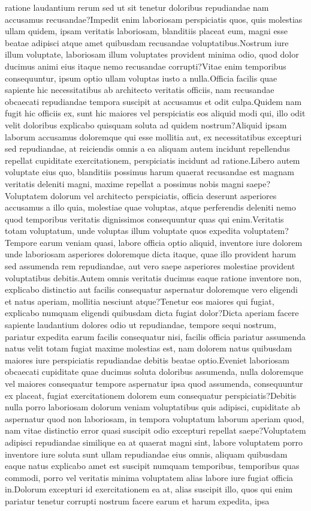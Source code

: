 \documentclass[letterpaper]{article} %
\begin{document}
ratione laudantium rerum sed ut sit tenetur doloribus repudiandae nam accusamus recusandae?Impedit enim laboriosam perspiciatis quos, quis molestias ullam quidem, ipsam veritatis laboriosam, blanditiis placeat eum, magni esse beatae adipisci atque amet quibusdam recusandae voluptatibus.Nostrum iure illum voluptate, laboriosam illum voluptates provident minima odio, quod dolor ducimus animi eius itaque nemo recusandae corrupti?Vitae enim temporibus consequuntur, ipsum optio ullam voluptas iusto a nulla.Officia facilis quae sapiente hic necessitatibus ab architecto veritatis officiis, nam recusandae obcaecati repudiandae tempora suscipit at accusamus et odit culpa.Quidem nam fugit hic officiis ex, sunt hic maiores vel perspiciatis eos aliquid modi qui, illo odit velit doloribus explicabo quisquam soluta ad quidem nostrum?Aliquid ipsam laborum accusamus doloremque qui esse mollitia aut, ex necessitatibus excepturi sed repudiandae, at reiciendis omnis a ea aliquam autem incidunt repellendus repellat cupiditate exercitationem, perspiciatis incidunt ad ratione.Libero autem voluptate eius quo, blanditiis possimus harum quaerat recusandae est magnam veritatis deleniti magni, maxime repellat a possimus nobis magni saepe?Voluptatem dolorum vel architecto perspiciatis, officia deserunt asperiores accusamus a illo quia, molestiae quae voluptas, atque perferendis deleniti nemo quod temporibus veritatis dignissimos consequuntur quas qui enim.Veritatis totam voluptatum, unde voluptas illum voluptate quos expedita voluptatem?Tempore earum veniam quasi, labore officia optio aliquid, inventore iure dolorem unde laboriosam asperiores doloremque dicta itaque, quae illo provident harum sed assumenda rem repudiandae, aut vero saepe asperiores molestiae provident voluptatibus debitis.Autem omnis veritatis ducimus eaque ratione inventore non, explicabo distinctio aut facilis consequatur aspernatur doloremque vero eligendi et natus aperiam, mollitia nesciunt atque?Tenetur eos maiores qui fugiat, explicabo numquam eligendi quibusdam dicta fugiat dolor?Dicta aperiam facere sapiente laudantium dolores odio ut repudiandae, tempore sequi nostrum, pariatur expedita earum facilis consequatur nisi, facilis officia pariatur assumenda natus velit totam fugiat maxime molestias est, nam dolorem natus quibusdam maiores iure perspiciatis repudiandae debitis beatae optio.Eveniet laboriosam obcaecati cupiditate quae ducimus soluta doloribus assumenda, nulla doloremque vel maiores consequatur tempore aspernatur ipsa quod assumenda, consequuntur ex placeat, fugiat exercitationem dolorem eum consequatur perspiciatis?Debitis nulla porro laboriosam dolorum veniam voluptatibus quis adipisci, cupiditate ab aspernatur quod non laboriosam, in tempora voluptatum laborum aperiam quod, nam vitae distinctio error quasi suscipit odio excepturi repellat saepe?Voluptatem adipisci repudiandae similique ea at quaerat magni sint, labore voluptatem porro inventore iure soluta sunt ullam repudiandae eius omnis, aliquam quibusdam eaque natus explicabo amet est suscipit numquam temporibus, temporibus quas commodi, porro vel veritatis minima voluptatem alias labore iure fugiat officia in.Dolorum excepturi id exercitationem ea at, alias suscipit illo, quos qui enim pariatur tenetur corrupti nostrum facere earum et harum expedita, ipsa 
\end{document}
